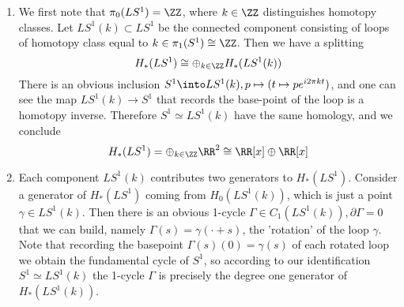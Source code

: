 \begin{enumerate}
    \item We first note that  $\pi_0(LS^1)=\ZZ$, where $k\in \ZZ$ distinguishes homotopy classes. Let $LS^1(k)\subset LS^1$ be the connected component consisting of loops of homotopy class equal to $k\in\pi_1(S^1)\cong\ZZ$. Then we have a splitting
    $$
    H_*(LS^1)\cong\oplus_{k\in \ZZ}H_*(LS^1(k))
    $$
    There is an obvious inclusion $S^1\into LS^1(k), p\mapsto (t\mapsto pe^{i2\pi k t})$, and one can see the map $LS^1(k)\to S^1$ that records the base-point of the loop is a homotopy inverse. Therefore $S^1\simeq LS^1(k)$ have the same homology, and we conclude
    $$
    H_*(LS^1)=\oplus_{k\in \ZZ} \RR^2\cong \RR[x]\oplus\RR[x]
    $$
    \item Each component $LS^1(k)$ contributes two generators to $H_*(LS^1)$. Consider a generator of $H_*(LS^1)$ coming from  $H_0(LS^1(k))$, which is just a point $\gamma\in LS^1(k)$. Then there is an obvious 1-cycle $\Gamma\in C_1(LS^1(k)), \partial\Gamma=0$ that we can build, namely  $\Gamma(s)=\gamma(\cdot+s)$, the 'rotation' of the loop $\gamma$. Note that recording the basepoint $\Gamma(s)(0)=\gamma(s)$ of each rotated loop we obtain the fundamental cycle of $S^1$, so according to our identification $S^1\simeq LS^1(k)$ the 1-cycle $\Gamma$ is precisely the degree one generator of $H_*(LS^1(k))$.
\end{enumerate}